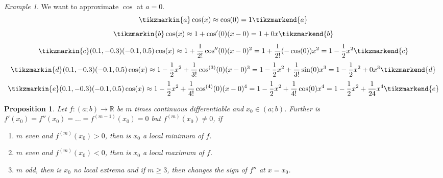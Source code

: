 \documentclass[english,titlepage]{uzhpub}
\theoremstyle{definition}
\theoremstyle{plain}
\newtheorem{proposition}[definition]{Proposition}
\theoremstyle{remark}
\theoremstyle{example}
\newtheorem*{example}{Example}
\begin{document}
   \begin{example}
      We want to approximate \(\cos\) at \(a = 0\).
      \begin{equation*}
         \tikzmarkin{a} \cos(x) \approx \cos(0) = 1 \tikzmarkend{a}
      \end{equation*}
      \begin{equation*}
         \tikzmarkin{b} \cos(x) \approx 1 + \cos'(0)(x-0) = 1 + 0x \tikzmarkend{b}
      \end{equation*}
      \begin{equation*}
         \tikzmarkin{c}(0.1,-0.3)(-0.1,0.5) \cos(x) \approx 1 + \frac{1}{2!}\cos''(0)(x - 0)^2 = 1 + \frac{1}{2!}(-\cos(0))x^2 = 1 - \frac{1}{2}x^2 \tikzmarkend{c}
      \end{equation*}
      \begin{equation*}
         \tikzmarkin{d}(0.1,-0.3)(-0.1,0.5) \cos(x) \approx 1 - \frac{1}{2}x^2 + \frac{1}{3!}\cos^{(3)}(0)(x-0)^3 = 1 - \frac{1}{2}x^2 + \frac{1}{3!}\sin(0)x^3 = 1 - \frac{1}{2}x^2 + 0x^3 \tikzmarkend{d}
      \end{equation*}
      \begin{equation*}
         \tikzmarkin{e}(0.1,-0.3)(-0.1,0.5) \cos(x) \approx 1 - \frac{1}{2}x^2 + \frac{1}{4!}\cos^{(4)}(0)(x-0)^4 = 1 - \frac{1}{2}x^2 + \frac{1}{4!}\cos(0)x^4 = 1 - \frac{1}{2}x^2 + \frac{1}{24}x^4 \tikzmarkend{e}
      \end{equation*}

      \begin{center}
         
      \end{center}
   \end{example}

   \begin{proposition}
      Let \(f: (a; b) \to \mathbb{R}\) be \(m\) times continuous differentiable and \(x_0 \in (a; b)\).
      Further is \(f'(x_0) = f''(x_0) = \ldots = f^{(m-1)}(x_0) = 0\) but \(f^{(m)}(x_0) \neq 0\), if
      \begin{enumerate}[label=\roman*, align=Center]
         \item \(m\) even and \(f^{(m)}(x_0) > 0\), then is \(x_0\) a local \textit{minimum} of \(f\).
         \item \(m\) even and \(f^{(m)}(x_0) < 0\), then is \(x_0\) a local \textit{maximum} of \(f\).
         \item \(m\) odd, then is \(x_0\) no local extrema and if \(m \geq 3\), then changes the sign of \(f''\) at \(x = x_0\).
      \end{enumerate}
   \end{proposition}
\end{document}
